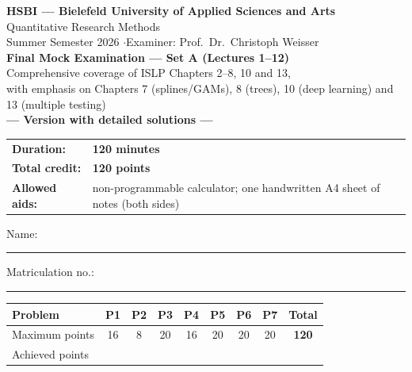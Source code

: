 \documentclass[11pt,a4paper]{article}
\begin{document}
\begin{center}
  {\Large\textbf{HSBI --- Bielefeld University of Applied Sciences and Arts}}\\[1.2mm]
  {\large Quantitative Research Methods}\\[1mm]
  {\normalsize Summer Semester 2026 \quad$\cdot$\quad Examiner: Prof.\ Dr.\ Christoph Weisser}\\[4.5mm]
  {\LARGE\textbf{Final Mock Examination --- Set A (Lectures 1--12)}}\\[1.2mm]
  {\normalsize Comprehensive coverage of ISLP Chapters 2--8, 10 and 13,\\
   with emphasis on Chapters 7 (splines/GAMs), 8 (trees), 10 (deep learning) and 13 (multiple testing)}%
  \ifdefined\withsolutions\\[2.2mm]{\large\textcolor{teal!55!black}{\textbf{--- Version with detailed solutions ---}}}\fi
\end{center}

\vspace{2.5mm}
\begin{center}
\begin{tabular}{@{}ll@{}}
  \textbf{Duration:} & \textbf{120 minutes}\\
  \textbf{Total credit:} & \textbf{120 points}\\
  \textbf{Allowed aids:} & non-programmable calculator; one handwritten A4 sheet of notes (both sides)\\
\end{tabular}
\end{center}

\vspace{3mm}
Name: \rule[-1mm]{0.38\textwidth}{0.4pt}\hfill Matriculation no.: \rule[-1mm]{0.24\textwidth}{0.4pt}

\vspace{4.5mm}
\begin{center}
\renewcommand{\arraystretch}{1.35}
\begin{tabular}{|l|c|c|c|c|c|c|c|c|}
\hline
\textbf{Problem} & \textbf{P1} & \textbf{P2} & \textbf{P3} & \textbf{P4} & \textbf{P5} & \textbf{P6} & \textbf{P7} & \textbf{Total}\\\hline
Maximum points & 16 & 8 & 20 & 16 & 20 & 20 & 20 & \textbf{120}\\\hline
Achieved points & \hspace{8mm} & \hspace{8mm} & \hspace{8mm} & \hspace{8mm} & \hspace{8mm} & \hspace{8mm} & \hspace{8mm} & \hspace{10mm}\\\hline
\end{tabular}
\end{center}
\end{document}

